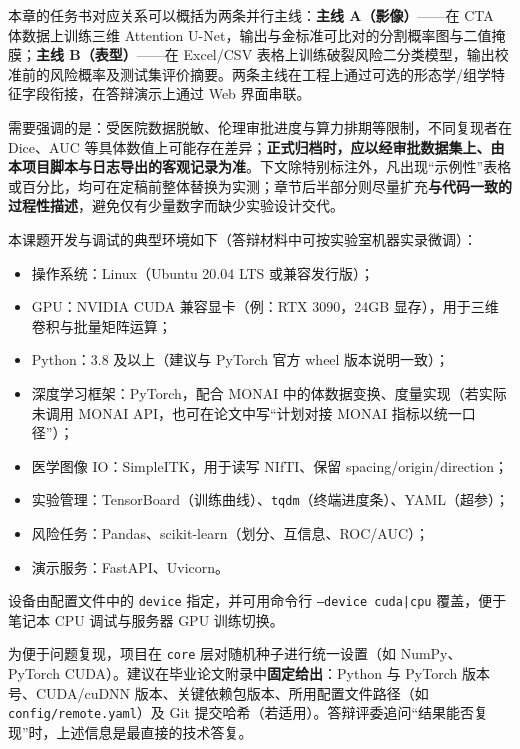 
本章的任务书对应关系可以概括为两条并行主线：\textbf{主线 A（影像）}——在 CTA 体数据上训练三维 Attention U-Net，输出与金标准可比对的分割概率图与二值掩膜；\textbf{主线 B（表型）}——在 Excel/CSV 表格上训练破裂风险二分类模型，输出校准前的风险概率及测试集评价摘要。两条主线在工程上通过可选的形态学/组学特征字段衔接，在答辩演示上通过 Web 界面串联。

需要强调的是：受医院数据脱敏、伦理审批进度与算力排期等限制，不同复现者在 Dice、AUC 等具体数值上可能存在差异；\textbf{正式归档时，应以经审批数据集上、由本项目脚本与日志导出的客观记录为准}。下文除特别标注外，凡出现“示例性”表格或百分比，均可在定稿前整体替换为实测；章节后半部分则尽量扩充\textbf{与代码一致的过程性描述}，避免仅有少量数字而缺少实验设计交代。

本课题开发与调试的典型环境如下（答辩材料中可按实验室机器实录微调）：
\begin{itemize}
	\item 操作系统：Linux（Ubuntu 20.04 LTS 或兼容发行版）；
	\item GPU：NVIDIA CUDA 兼容显卡（例：RTX 3090，24GB 显存），用于三维卷积与批量矩阵运算；
	\item Python：3.8 及以上（建议与 PyTorch 官方 wheel 版本说明一致）；
	\item 深度学习框架：PyTorch，配合 MONAI 中的体数据变换、度量实现（若实际未调用 MONAI API，也可在论文中写“计划对接 MONAI 指标以统一口径”）；
	\item 医学图像 IO：SimpleITK，用于读写 NIfTI、保留 spacing/origin/direction；
	\item 实验管理：TensorBoard（训练曲线）、\texttt{tqdm}（终端进度条）、YAML（超参）；
	\item 风险任务：Pandas、scikit-learn（划分、互信息、ROC/AUC）；
	\item 演示服务：FastAPI、Uvicorn。
\end{itemize}

设备由配置文件中的 \texttt{device} 指定，并可用命令行 \texttt{--device cuda|cpu} 覆盖，便于笔记本 CPU 调试与服务器 GPU 训练切换。

为便于问题复现，项目在 \texttt{core} 层对随机种子进行统一设置（如 NumPy、PyTorch CUDA）。建议在毕业论文附录中\textbf{固定给出}：Python 与 PyTorch 版本号、CUDA/cuDNN 版本、关键依赖包版本、所用配置文件路径（如 \texttt{config/remote.yaml}）及 Git 提交哈希（若适用）。答辩评委追问“结果能否复现”时，上述信息是最直接的技术答复。

